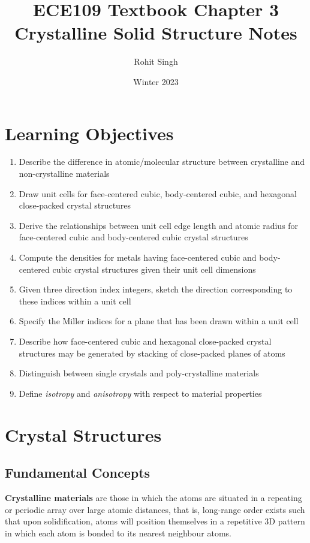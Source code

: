 \documentclass{article}
\title{ECE109 Textbook Chapter 3 Crystalline Solid Structure Notes}
\author{Rohit Singh}
\date{Winter 2023}
\begin{document}
\maketitle

\tableofcontents

\section{Learning Objectives}

\begin{enumerate}
    \item Describe the difference in atomic/molecular structure between crystalline and non-crystalline materials
    \item Draw unit cells for face-centered cubic, body-centered cubic, and hexagonal close-packed crystal structures
    \item Derive the relationships between unit cell edge length and atomic radius for face-centered cubic and body-centered cubic crystal structures
    \item Compute the densities for metals having face-centered cubic and body-centered cubic crystal structures given their unit cell dimensions
    \item Given three direction index integers, sketch the direction corresponding to these indices within a unit cell
    \item Specify the Miller indices for a plane that has been drawn within a unit cell
    \item Describe how face-centered cubic and hexagonal close-packed crystal structures may be generated by stacking of close-packed planes of atoms
    \item Distinguish between single crystals and poly-crystalline materials
    \item Define \textit{isotropy} and \textit{anisotropy} with respect to material properties
\end{enumerate}

\section{Crystal Structures}

\subsection{Fundamental Concepts}

\textbf{Crystalline materials} are those in which the atoms are situated in a repeating or periodic array over large atomic distances, that is, long-range order exists such that upon solidification, atoms will position themselves in a repetitive 3D pattern in which each atom is bonded to its nearest neighbour atoms.
\end{document}
